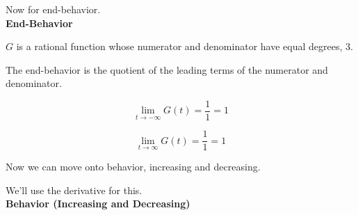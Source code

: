 \documentclass{ximera}
\begin{document}
Now for end-behavior. \\








\textbf{\textcolor{purple!85!blue}{End-Behavior}} \\

\begin{explanation}

$G$ is a rational function whose numerator and denominator have equal degrees, $3$.

The end-behavior is the quotient of the leading terms of the numerator and denominator.

\[
\lim\limits_{t \to -\infty} G(t) = \frac{1}{1} = 1
\]


\[
\lim\limits_{t \to \infty} G(t) = \frac{1}{1} = 1
\]

\end{explanation}




Now we can move onto behavior, increasing and decreasing.

We'll use the derivative for this. \\

























\textbf{\textcolor{purple!85!blue}{Behavior (Increasing and Decreasing)}} \\
\end{document}
